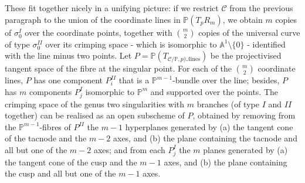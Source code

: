 \documentclass{compositio}
\newcommand{\PP}{\mathbb P}
\newcommand{\Aaff}{\mathbb A}
\theoremstyle{plain}
\theoremstyle{definition}
\theoremstyle{remark}
\begin{document}
These fit together nicely in a unifying picture: if we restrict $\mathcal C$ from the previous paragraph to the union of the coordinate lines in $\PP(T_pR_m)$, we obtain $m$ copies of $\sigma_0^{I}$ over the coordinate points, together with $\binom{m}{2}$ copies of the universal curve of type $\sigma_0^{I\!I}$ over its crimping space - which is isomorphic to $\Aaff^1\setminus\{0\}$ - identified with the line minus two points. Let $P=\PP(T_{\mathcal C/\PP,p|\cup\text{lines}})$ be the projectivised tangent space of the fibre at the singular point. For each of the $\binom{m}{2}$ coordinate lines, $P$ has one component $P^{I\!I}_i$ that is a $\PP^{m-1}$-bundle over the line; besides, $P$ has $m$ components $P^{I}_j$ isomorphic to $\PP^m$ and supported over the points. The crimping space of the genus two singularities with $m$ branches (of type $I$ and $I\!I$ together) can be realised as an open subscheme of $P$, obtained by removing from the $\PP^{m-1}$-fibres of $P^{I\!I}$ the $m-1$ hyperplanes generated by (a) the tangent cone of the tacnode and the $m-2$ axes, and (b) the plane containing the tacnode and all but one of the $m-2$ axes; and from each $P^{I}_j$ the $m$ planes generated by (a) the tangent cone of the cusp and the $m-1$ axes, and (b) the plane containing the cusp and all but one of the $m-1$ axes.
\end{document}

